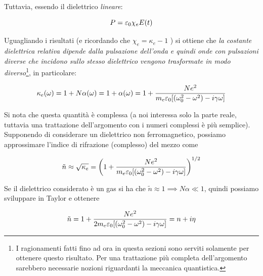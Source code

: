 Tuttavia, essendo il dielettrico \emph{lineare}:

\begin{equation}
    P = \varepsilon_0 \chi_e E(t)
\end{equation}

Uguagliando i risultati (e ricordando che $\chi_e = \kappa_e - 1$ ) si ottiene che \emph{la costante dielettrica relativa dipende dalla pulsazione dell'onda e quindi onde con pulsazioni diverse che incidono sullo stesso dielettrico vengono trasformate in modo diverso}\footnote{I ragionamenti fatti fino ad ora in questa sezioni sono serviti solamente per ottenere questo risultato. Per una trattazione più completa dell'argomento sarebbero necessarie nozioni riguardanti la meccanica quantistica.}, in particolare:

\begin{tcolorbox}[colback=yellow!10!white, colframe=orange!70!black, boxrule=0.8pt]
\begin{equation} \label{eq: Relazione_generale_indice_rifr}
    \kappa_e (\omega) = 1 + N\alpha(\omega) = 1 + \alpha(\omega) = 1 + \frac{N e^2}{m_e \varepsilon_0[(\omega_0^2 - \omega^2) - i\gamma \omega]}
\end{equation}
\end{tcolorbox}

Si nota che questa quantità è complessa (a noi interessa solo la parte reale, tuttavia una trattazione dell'argomento con i numeri complessi è più semplice).\\
Supponendo di considerare un dielettrico non ferromagnetico, possiamo approssimare l'indice di rifrazione (complesso) del mezzo come 

\begin{equation}
    \tilde{n} \approx \sqrt{\kappa_e} = \left( 1 + \frac{N e^2}{m_e \varepsilon_0 [(\omega_0^2 - \omega^2) - i\gamma \omega]} \right) ^{1/2}
\end{equation}

Se il dielettrico considerato è un gas si ha che $\tilde{n} \approx 1 \implies N\alpha \ll 1$, quindi possiamo sviluppare in Taylor e ottenere 

\begin{tcolorbox}[colback=yellow!10!white, colframe=orange!70!black, boxrule=0.8pt]
\begin{equation}
    \tilde{n} = 1 + \frac{N e^2}{2m_e \varepsilon_0[(\omega_0^2 - \omega^2) - i\gamma \omega]} = n + i \eta
\end{equation}
\end{tcolorbox}

